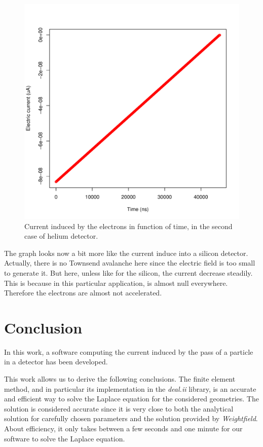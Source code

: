 \documentclass[11pt]{article}
\begin{document}
				\begin{figure}[H]
				  \center
				  \includegraphics[scale=0.4]{images/applications/helium2_precise.pdf}
				  \caption{Current induced by the electrons in function of time, in the second case of helium detector.}
				  \label{fig:helium2_precise}
				\end{figure}

				The graph looks now a bit more like the current induce into a silicon detector. Actually, there is no
				Townsend avalanche here since the electric field is too small to generate it. But here, unless like for the
				silicon, the current decrease steadily. This is because in this particular application, is almost null everywhere.
				Therefore the electrons are almost not accelerated.

\section*{Conclusion}

	In this work, a software computing the current induced by the pass of a
	particle in a detector has been developed.

	This work allows us to derive the following conclusions. The finite element
	method, and in particular its implementation in the \textit{deal.ii} library,
	is an accurate and efficient way to solve the Laplace equation for the
	considered geometries. The solution is considered accurate since it is
	very close to both the analytical solution for carefully chosen parameters and
	the solution provided by \textit{Weightfield}. About efficiency, it only takes between a few seconds
	and one minute for our software to solve the Laplace equation.
\end{document}
